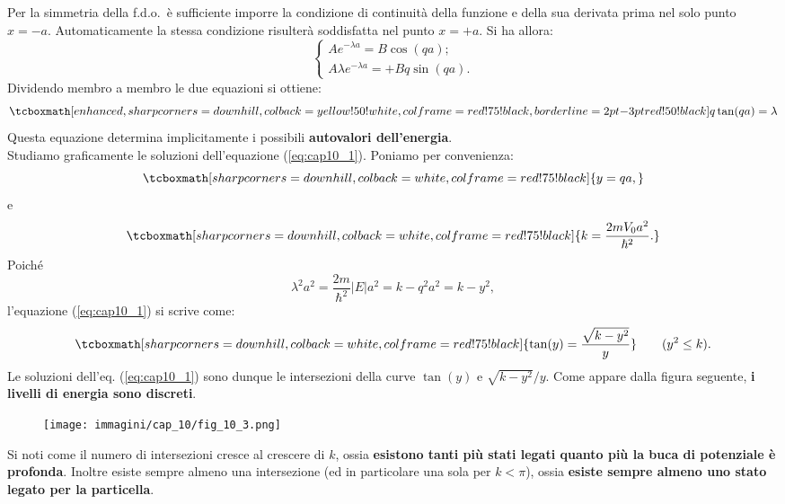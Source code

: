 Per la simmetria della f.d.o.~è sufficiente imporre la condizione di continuità della funzione e della sua derivata prima nel solo punto $x=-a$. Automaticamente la stessa condizione risulterà soddisfatta nel punto $x=+a$. Si ha allora:
	\begin{equation}
		\begin{cases}
		Ae^{-\lambda a} =B\cos(qa) ;\\
		A \lambda e^{-\lambda a} = +Bq \sin(qa).\end{cases} 
	\end{equation}
Dividendo membro a membro le due equazioni si ottiene:
	\begin{equation}
		\tcboxmath[enhanced, sharp corners=downhill, colback=yellow!50!white, colframe=red!75!black, borderline={2pt}{-3pt}{red!50!black}]{
			q \tan (qa) =\lambda
			}
	\label{eq:cap10_1}
	\end{equation}
Questa equazione determina implicitamente i possibili \textbf{autovalori dell'energia}.\\

Studiamo graficamente le soluzioni dell'equazione (\ref{eq:cap10_1}). Poniamo per convenienza:
	\begin{equation}
		\tcboxmath[sharp corners=downhill, colback=white, colframe=red!75!black]{
			y=qa,
			}
	\end{equation}
e
	\begin{equation}
		\tcboxmath[sharp corners=downhill, colback=white, colframe=red!75!black]{
		k=\frac{2mV_0 a^2}{\hbar ^2}.
		}
	\end{equation}
Poiché
	\begin{equation}
		\lambda ^2 a^2 = \frac{2m }{\hbar ^2}|E|a^2=k-q^2 a^2 =k-y^2,
	\end{equation}
l'equazione (\ref{eq:cap10_1}) si scrive come:
	\begin{equation}
		\tcboxmath[sharp corners=downhill, colback=white, colframe=red!75!black]{
			\tan (y) = \frac{\sqrt{k-y^2}}{y}
			} \qquad (y^2 \leq k).
	\end{equation}
Le soluzioni dell'eq. (\ref{eq:cap10_1}) sono dunque le intersezioni della curve $\tan (y)$ e $\sqrt{k-y^2}/y$. Come appare dalla figura seguente, \textbf{i livelli di energia sono discreti}.
\begin{figure}[!htbp]
\texttt{[image: immagini/cap\_10/fig\_10\_3.png]}
\end{figure}
\newpage

Si noti come il numero di intersezioni cresce al crescere di $k$, ossia \textbf{esistono tanti più stati legati quanto più la buca di potenziale è profonda}. Inoltre esiste sempre almeno una intersezione (ed in particolare una sola per $k<\pi$), ossia \textbf{esiste sempre almeno uno stato legato per la particella}.\\

